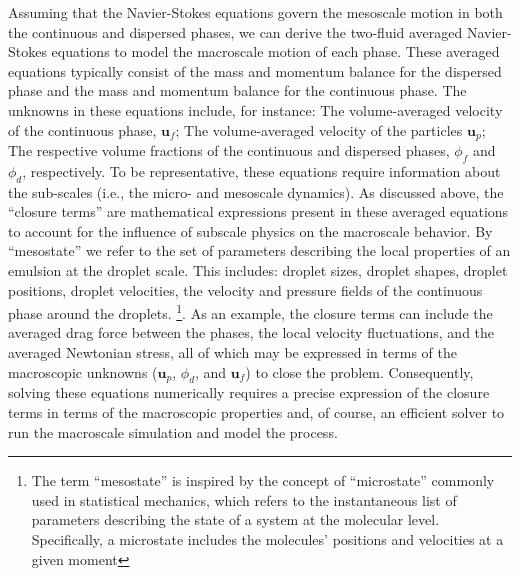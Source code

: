 Assuming that the Navier-Stokes equations govern the mesoscale motion in both the continuous and dispersed phases, we can derive the two-fluid averaged Navier-Stokes equations to model the macroscale motion of each phase. 
These averaged equations typically consist of the mass and momentum balance for the dispersed phase and the mass and momentum balance for the continuous phase. 
The unknowns in these equations include, for instance: The volume-averaged velocity of the continuous phase, $\textbf{u}_f$; The volume-averaged velocity of the particles $\textbf{u}_p$; The respective volume fractions of the continuous and dispersed phases, $\phi_f$ and $\phi_d$, respectively. 
To be representative, these equations require information about the sub-scales (i.e., the micro- and mesoscale dynamics).
As discussed above, the ``closure terms'' are mathematical expressions present in these averaged equations to account for the influence of subscale physics on the macroscale behavior. 
By ``mesostate'' we refer to the set of parameters describing the local properties of an emulsion at the droplet scale.
This includes:  droplet sizes, droplet shapes, droplet positions, droplet velocities, the velocity and pressure fields of the continuous phase around the droplets.
\footnote{
    The term ``mesostate'' is inspired by the concept of ``microstate'' commonly used in statistical mechanics, which refers to the instantaneous list of parameters describing the state of a system at the molecular level. Specifically, a microstate includes the molecules' positions and velocities at a given moment
    }. 
As an example, the closure terms can include the averaged drag force between the phases, the local velocity fluctuations, and the averaged Newtonian stress, all of which may be expressed in terms of the macroscopic unknowns ($\textbf{u}_p$, $\phi_d$, and $\textbf{u}_f$) to close the problem.
Consequently, solving these equations numerically requires a precise expression of the closure terms in terms of the macroscopic properties and, of course, an efficient solver to run the macroscale simulation and model the process.

